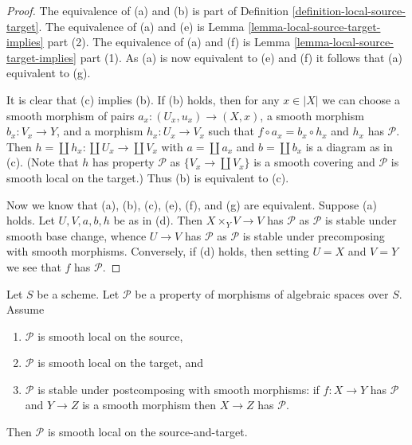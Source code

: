 \begin{proof}
The equivalence of (a) and (b) is part of
Definition \ref{definition-local-source-target}.
The equivalence of (a) and (e) is
Lemma \ref{lemma-local-source-target-implies} part (2).
The equivalence of (a) and (f) is
Lemma \ref{lemma-local-source-target-implies} part (1).
As (a) is now equivalent to (e) and (f) it follows that
(a) equivalent to (g).

\medskip\noindent
It is clear that (c) implies (b). If (b) holds, then for any
$x \in |X|$ we can choose a smooth morphism of pairs
$a_x : (U_x, u_x) \to (X, x)$, a smooth morphism $b_x : V_x \to Y$, and
a morphism $h_x : U_x \to V_x$ such that $f \circ a_x = b_x \circ h_x$ and
$h_x$ has $\mathcal{P}$. Then $h = \coprod h_x : \coprod U_x \to \coprod V_x$
with $a = \coprod a_x$ and $b = \coprod b_x$ is a diagram as in (c).
(Note that $h$ has property $\mathcal{P}$ as $\{V_x \to \coprod V_x\}$
is a smooth covering and $\mathcal{P}$ is smooth local on the target.)
Thus (b) is equivalent to (c).

\medskip\noindent
Now we know that (a), (b), (c), (e), (f), and (g) are equivalent.
Suppose (a) holds. Let $U, V, a, b, h$ be as in (d). Then
$X \times_Y V \to V$ has $\mathcal{P}$ as $\mathcal{P}$ is stable under
smooth base change, whence $U \to V$ has $\mathcal{P}$ as $\mathcal{P}$
is stable under precomposing with smooth morphisms. Conversely, if (d)
holds, then setting $U = X$ and $V = Y$ we see that $f$ has $\mathcal{P}$.
\end{proof}

\begin{lemma}
\label{lemma-smooth-local-source-target}
Let $S$ be a scheme.
Let $\mathcal{P}$ be a property of morphisms of algebraic spaces over $S$.
Assume
\begin{enumerate}
\item $\mathcal{P}$ is smooth local on the source,
\item $\mathcal{P}$ is smooth local on the target, and
\item $\mathcal{P}$ is stable under postcomposing with smooth morphisms:
if $f : X \to Y$ has $\mathcal{P}$ and $Y \to Z$ is a smooth morphism
then $X \to Z$ has $\mathcal{P}$.
\end{enumerate}
Then $\mathcal{P}$ is smooth local on the source-and-target.
\end{lemma}

